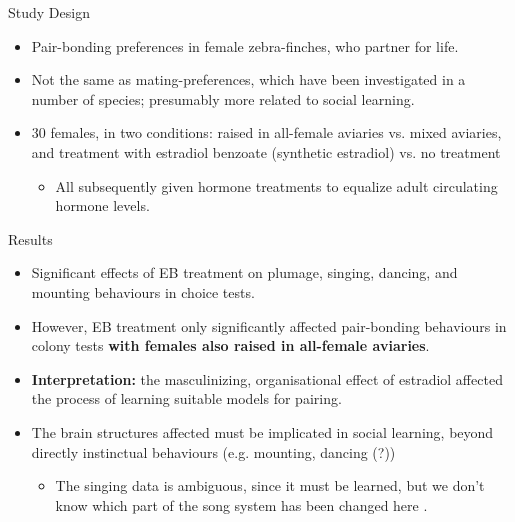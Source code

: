 \documentclass[hyperref={pdfpagelabels=false}]{beamer}
\begin{document}
\begin{frame}{\citet{mansukhanietal1996}}
\begin{block}{Study Design}
\begin{itemize}
	\item Pair-bonding preferences in female zebra-finches, who partner for life.
	\item Not the same as mating-preferences, which have been investigated in a number of species; presumably more related to social learning.
	\item 30 females, in two conditions: raised in all-female aviaries vs. mixed aviaries, and treatment with estradiol benzoate (synthetic estradiol) vs. no treatment
		\begin{itemize}
		\item All subsequently given hormone treatments to equalize adult circulating hormone levels.
		\end{itemize}
\end{itemize}
\end{block}
\end{frame}

\begin{frame}{\citet{mansukhanietal1996}}
\begin{block}{Results}
\begin{itemize}
	\item Significant effects of EB treatment on plumage, singing, dancing, and mounting behaviours in choice tests.
	\item However, EB treatment only significantly affected pair-bonding behaviours in colony tests \textbf{with females also raised in all-female aviaries}.
	\item \textbf{Interpretation:} the masculinizing, organisational effect of estradiol affected the process of learning suitable models for pairing.
	\item The brain structures affected must be implicated in social learning, beyond directly instinctual behaviours (e.g. mounting, dancing (?))
		\begin{itemize}
			\item The singing data is ambiguous, since it must be learned, but we don't know which part of the song system has been changed here \citep[see][]{balthazartetal2009}.
		\end{itemize}
	\end{itemize}
\end{block}
\end{frame}
\end{document}

